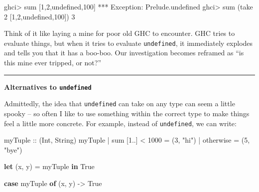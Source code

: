 \documentclass[]{article}
\newenvironment{Shaded}{}{}
\newcommand{\DataTypeTok}[1]{\textcolor[rgb]{0.56,0.13,0.00}{#1}}
\newcommand{\DecValTok}[1]{\textcolor[rgb]{0.25,0.63,0.44}{#1}}
\newcommand{\FunctionTok}[1]{\textcolor[rgb]{0.02,0.16,0.49}{#1}}
\newcommand{\KeywordTok}[1]{\textcolor[rgb]{0.00,0.44,0.13}{\textbf{#1}}}
\newcommand{\NormalTok}[1]{#1}
\newcommand{\OperatorTok}[1]{\textcolor[rgb]{0.40,0.40,0.40}{#1}}
\newcommand{\OtherTok}[1]{\textcolor[rgb]{0.00,0.44,0.13}{#1}}
\newcommand{\StringTok}[1]{\textcolor[rgb]{0.25,0.44,0.63}{#1}}
\begin{document}
\begin{Shaded}
\begin{Highlighting}[]
\NormalTok{ghci}\OperatorTok{\textgreater{}} \FunctionTok{sum}\NormalTok{ [}\DecValTok{1}\NormalTok{,}\DecValTok{2}\NormalTok{,}\FunctionTok{undefined}\NormalTok{,}\DecValTok{100}\NormalTok{]}
\OperatorTok{***} \DataTypeTok{Exception}\OperatorTok{:}\NormalTok{ Prelude.undefined}
\NormalTok{ghci}\OperatorTok{\textgreater{}} \FunctionTok{sum}\NormalTok{ (}\FunctionTok{take} \DecValTok{2}\NormalTok{ [}\DecValTok{1}\NormalTok{,}\DecValTok{2}\NormalTok{,}\FunctionTok{undefined}\NormalTok{,}\DecValTok{100}\NormalTok{])}
\DecValTok{3}
\end{Highlighting}
\end{Shaded}

Think of it like laying a mine for poor old GHC to encounter. GHC tries to
evaluate things, but when it tries to evaluate \texttt{undefined}, it
immediately explodes and tells you that it has a boo-boo. Our investigation
becomes reframed as ``is this mine ever tripped, or not?''

\begin{center}\rule{0.5\linewidth}{0.5pt}\end{center}

\textbf{Alternatives to \texttt{undefined}}

Admittedly, the idea that \texttt{undefined} can take on any type can seem a
little spooky -- so often I like to use something within the correct type to
make things feel a little more concrete. For example, instead of
\texttt{undefined}, we can write:

\begin{Shaded}
\begin{Highlighting}[]
\OtherTok{myTuple ::}\NormalTok{ (}\DataTypeTok{Int}\NormalTok{, }\DataTypeTok{String}\NormalTok{)}
\NormalTok{myTuple}
  \OperatorTok{|} \FunctionTok{sum}\NormalTok{ [}\DecValTok{1}\OperatorTok{..}\NormalTok{] }\OperatorTok{\textless{}} \DecValTok{1000} \OtherTok{=}\NormalTok{ (}\DecValTok{3}\NormalTok{, }\StringTok{"hi"}\NormalTok{)}
  \OperatorTok{|} \FunctionTok{otherwise}        \OtherTok{=}\NormalTok{ (}\DecValTok{5}\NormalTok{, }\StringTok{"bye"}\NormalTok{)}

\KeywordTok{let}\NormalTok{ (x, y) }\OtherTok{=}\NormalTok{ myTuple}
\KeywordTok{in}  \DataTypeTok{True}

\KeywordTok{case}\NormalTok{ myTuple }\KeywordTok{of}
\NormalTok{    (x, y) }\OtherTok{{-}\textgreater{}} \DataTypeTok{True}
\end{Highlighting}
\end{Shaded}
\end{document}
